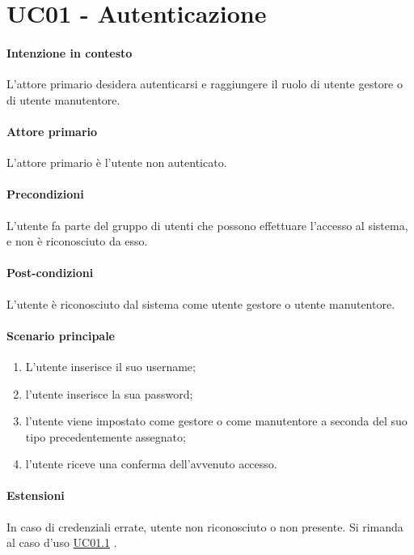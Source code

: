 \section{UC01 - Autenticazione}\label{uc:01}

\paragraph{Intenzione in contesto} L'attore primario desidera autenticarsi e raggiungere il ruolo di utente gestore o di utente manutentore.

\paragraph{Attore primario} L'attore primario è l'utente non autenticato.

\paragraph{Precondizioni} L'utente fa parte del gruppo di utenti che possono effettuare l'accesso al sistema, e non è riconosciuto da esso.

\paragraph{Post-condizioni} L'utente è riconosciuto dal sistema come utente gestore o utente manutentore.

\paragraph{Scenario principale}
\begin{enumerate}
    \item L'utente inserisce il suo username;
    \item l'utente inserisce la sua password;
    \item l'utente viene impostato come gestore o come manutentore a seconda del suo tipo precedentemente assegnato; 
    \item l'utente riceve una conferma dell'avvenuto accesso.
\end{enumerate}


\paragraph{Estensioni} In caso di credenziali errate, utente non riconosciuto o non presente. Si rimanda al caso d'uso \hyperref[uc:01.1]{UC01.1} .

